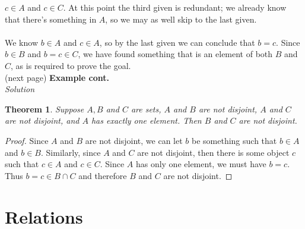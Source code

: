 \documentclass{report}
\newtheorem*{theorem}{Theorem}
\theoremstyle{definition}
\begin{document}
$c\in A$ and $c\in C$. At this point the third given is redundant; we already know that there's something in $A$, so we may as well skip to the last given.\\
\vspace{1mm}\\
We know $b\in A$ and $c\in A$, so by the last given we can conclude that $b=c$. Since $b\in B$ and $b=c\in C$, we have found something that is an element of both $B$ and $C$, as is required to 
prove the goal.\\
(next page)\newpage
\noindent\textbf{Example cont.}\\
\textit{Solution}
\begin{theorem}
Suppose $A,B$ and $C$ are sets, $A$ and $B$ are not disjoint, $A$ and $C$ are not disjoint, and $A$ has exactly one element. Then $B$ and $C$ are not disjoint.
\end{theorem}
\begin{proof}
Since $A$ and $B$ are not disjoint, we can let $b$ be something such that $b\in A$ and $b\in B$. Similarly, since $A$ and $C$ are not disjoint, then there is some object $c$ such that $c\in A$ and
$c\in C$. Since $A$ has only one element, we must have $b=c$. Thus $b=c\in B\cap C$ and therefore $B$ and $C$ are not disjoint.
\end{proof}

\chapter{Relations}
\end{document}
